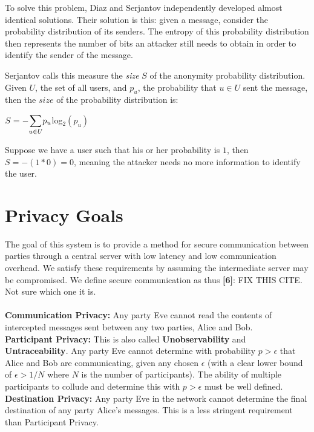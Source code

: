 \documentclass[twocolumn,11pt,english]{paper}
\begin{document}
To solve this problem, Diaz \cite{Diaz02} and Serjantov \cite{Serj02} independently developed almost identical solutions. Their solution is this: given a message, consider the probability distribution of its senders. The entropy of this probability distribution then represents the number of bits an attacker still needs to obtain in order to identify the sender of the message. 

Serjantov \cite{Serj02} calls this measure the \textit{size} $S$ of the anonymity probability distribution. Given $U$, the set of all users, and $p_u$, the probability that $u \in U$ sent the message, then the $size$ of the probability distribution is:

\begin{center}
  $ S = - \mathlarger{\sum}\limits_{u \in U} p_u $log$_2(p_u)$
\end{center}

Suppose we have a user such that his or her probability is $1$, then  $S = -(1 * 0) = 0$, meaning the attacker needs no more information to identify the user. 



\section{Privacy Goals}
The goal of this system is to provide a method for secure communication between parties through a central server with low latency and low communication overhead. We satisfy these requirements by assuming the intermediate server may be compromised. We define secure communication as thus \textbf{[6]}: FIX THIS CITE. Not sure which one it is.
\\\\\textbf{Communication Privacy:} Any party Eve cannot read the contents of intercepted messages sent between any two parties, Alice and Bob. 
\\\textbf{Participant Privacy:} This is also called \textbf{Unobservability} and \textbf{Untraceability}. Any party Eve cannot determine with probability $p > \epsilon$ that Alice and Bob are communicating, given any chosen $\epsilon$ (with a clear lower bound of $\epsilon > 1/N$ where $N$ is the number of participants). The ability of multiple participants to collude and determine this with $p > \epsilon$ must be well defined.
\\\textbf{Destination Privacy:} Any party Eve in the network cannot determine the final destination of any party Alice's messages. This is a less stringent requirement than Participant Privacy.
\end{document}

